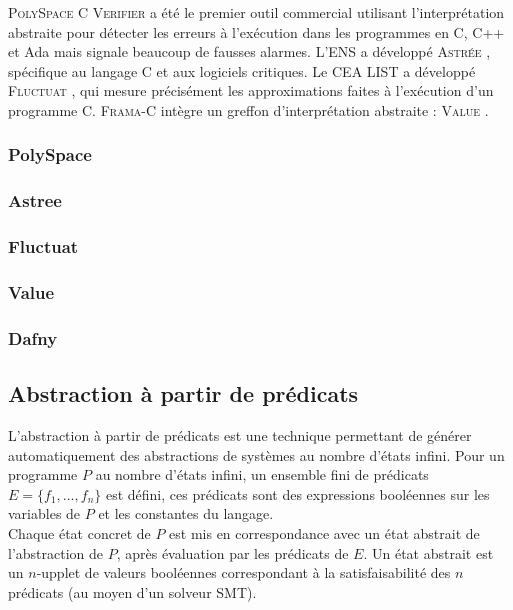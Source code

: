\textsc{PolySpace C Verifier} \cite{PolySpace} a été le premier outil commercial
utilisant l'interprétation abstraite pour détecter les erreurs à l'exécution
dans les programmes en C, C++ et Ada mais signale beaucoup de fausses alarmes.
L'ENS a développé \textsc{Astrée} \cite{ASTREE}, spécifique au langage C et aux
logiciels critiques. Le CEA LIST a développé \textsc{Fluctuat} \cite{Fluctuat},
qui mesure précisément les approximations faites à l'exécution d'un programme C.
\textsc{Frama-C} intègre un greffon d'interprétation abstraite : \textsc{Value}
\cite{Value}.


\subsubsection{PolySpace}

\subsubsection{Astree}

\subsubsection{Fluctuat}

\subsubsection{Value}

\subsubsection{Dafny}


\subsection{Abstraction à partir de prédicats}
\label{sec:abstraction-predicats}

L'abstraction à partir de prédicats \cite{predicate-abstraction} est une
technique permettant de générer automatiquement des abstractions de systèmes au
nombre d'états infini. Pour un programme $P$ au nombre d'états infini, un
ensemble fini de prédicats $E = \{f_1, ..., f_n\}$ est défini, ces prédicats
sont des expressions booléennes sur les variables de $P$ et les constantes du
langage.\\

Chaque état concret de $P$ est mis en correspondance avec un état abstrait de
l'abstraction de $P$, après évaluation par les prédicats de $E$. Un état
abstrait est un $n$-upplet de valeurs booléennes correspondant à la
satisfaisabilité des $n$ prédicats (au moyen d'un solveur SMT).\\

